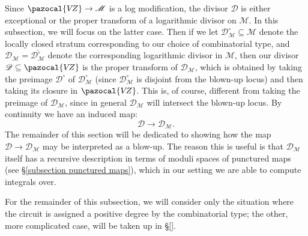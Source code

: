 \documentclass[11pt]{amsart}
\newcommand{\VZ}{\pazocal{V\!Z}}
\renewcommand{\to}{\rightarrow}
\newcommand{\Mcal}{\mathcal{M}}
\newcommand{\Dcal}{\mathcal{D}}
\theoremstyle{definition}
\theoremstyle{definition}
\begin{document}
Since $\VZ \to \Mcal$ is a log modification, the divisor $\Dcal$ is either exceptional or the proper transform of a logarithmic divisor on $\Mcal$. In this subsection, we will focus on the latter case. Then if we let $\Dcal_{\Mcal}^\circ\subseteq \Mcal$ denote the locally closed stratum corresponding to our choice of combinatorial type, and $\Dcal_\Mcal = \overline{\Dcal^\circ_\Mcal}$ denote the corresponding logarithmic divisor in $\Mcal$, then our divisor $\Dcal\subseteq\VZ$ is the proper transform of $\Dcal_\Mcal$, which is obtained by taking the preimage $\Dcal^\circ$ of $\Dcal_\Mcal^\circ$ (since $\Dcal^\circ_\Mcal$ is disjoint from the blown-up locus) and then taking its closure in $\VZ$. This is, of course, different from taking the preimage of $\Dcal_\Mcal$, since in general $\Dcal_\Mcal$ will intersect the blown-up locus. By continuity we have an induced map:
\begin{equation*} \Dcal \to \Dcal_\Mcal. \end{equation*}
The remainder of this section will be dedicated to showing how the map $\Dcal \to \Dcal_\Mcal$ may be interpreted as a blow-up. The reason this is useful is that $\Dcal_\Mcal$ itself has a recursive description in terms of moduli spaces of punctured maps (see \S \ref{subsection punctured maps}), which in our setting we are able to compute integrals over.

For the remainder of this subsection, we will consider only the situation where the circuit is assigned a positive degree by the combinatorial type; the other, more complicated case, will be taken up in \S \ref{}.
\end{document}
